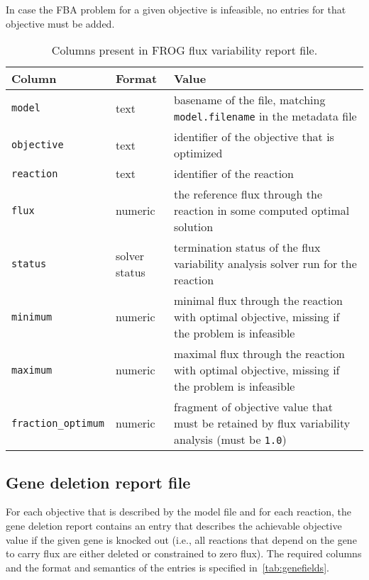 In case the FBA problem for a given objective is infeasible, no entries for that objective must be added.



\begin{table}[p]\tablefont
\begin{tabular}{llp{30em}}
\toprule
Column & Format & Value \\
\midrule
\verb|model|
 & text
 & basename of the file, matching \verb|model.filename| in the metadata file
 \\
\verb|objective|
 & text
 & identifier of the objective that is optimized
 \\
\verb|reaction|
 & text
 & identifier of the reaction
 \\
\verb|flux|
 & numeric
 & the reference flux through the reaction in some computed optimal solution
 \\
\verb|status|
 & solver status
 & termination status of the flux variability analysis solver run for the reaction
 \\
\verb|minimum|
 & numeric
 & minimal flux through the reaction with optimal objective, missing if the problem is infeasible
 \\
\verb|maximum|
 & numeric
 & maximal flux through the reaction with optimal objective, missing if the problem is infeasible
 \\
\verb|fraction_optimum|
 & numeric
 & fragment of objective value that must be retained by flux variability analysis (must be \verb|1.0|)
 \\
\bottomrule
\end{tabular}
\caption{Columns present in FROG flux variability report file.}
\label{tab:fvafields}
\end{table}

\subsection{Gene deletion report file}
\label{sec:genes}

For each objective that is described by the model file and for each reaction, the gene deletion report contains an entry that describes the achievable objective value if the given gene is knocked out (i.e., all reactions that depend on the gene to carry flux are either deleted or constrained to zero flux). The required columns and the format and semantics of the entries is specified in~\cref{tab:genefields}.

